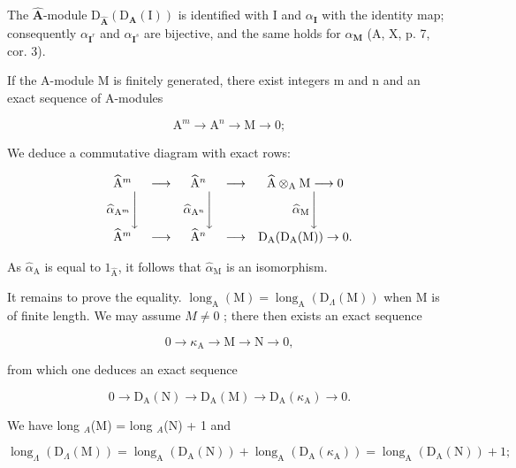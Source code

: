 The \(\widehat{\mathbf{A}}\)-module \(\mathrm{D}_{\widehat{\mathbf{A}}}(\mathrm{D}_{\mathbf{A}}(\mathrm{I}))\) is identified with I and \(\alpha_{\mathbf{I}}\) with the identity map; consequently \(\alpha_{\mathbf{I}^r}\) and \(\alpha_{\mathbf{I}^s}\) are bijective, and the same holds for \(\alpha_{\mathbf{M}}\) (A, X, p. 7, cor. 3).

If the A-module M is finitely generated, there exist integers m and n and an exact sequence of A-modules

\[
\mathrm{A} ^ {m} \longrightarrow \mathrm{A} ^ {n} \longrightarrow \mathrm{M} \rightarrow 0;
\]

We deduce a commutative diagram with exact rows:

\[
\begin{array}{c c c c c} \widehat {\mathrm{A}} ^ {m} & \longrightarrow & \widehat {\mathrm{A}} ^ {n} & \longrightarrow & \widehat {\mathrm{A}} \otimes_ {\mathrm{A}} \mathrm{M} \longrightarrow 0 \\ \widehat {\alpha} _ {\mathrm{A} ^ {m}} \Bigg \downarrow & & \widehat {\alpha} _ {\mathrm{A} ^ {n}} \Bigg \downarrow & & \widehat {\alpha} _ {\mathrm{M}} \Bigg \downarrow \\ \widehat {\mathrm{A}} ^ {m} & \longrightarrow & \widehat {\mathrm{A}} ^ {n} & \longrightarrow & \mathrm{D} _ {\mathrm{A}} (\mathrm{D} _ {\mathrm{A}} (\mathrm{M})) \to 0. \end{array}
\]

As \(\widehat{\alpha}_{\mathrm{A}}\) is equal to \(1_{\widehat{\mathrm{A}}}\), it follows that \(\widehat{\alpha}_{\mathrm{M}}\) is an isomorphism.

It remains to prove the equality. \(\operatorname{long}_{\mathrm{A}}(\mathrm{M}) = \operatorname{long}_{\mathrm{A}}(\mathrm{D}_{\Lambda}(\mathrm{M}))\) when M is of finite length. We may assume \(M \neq 0\) ; there then exists an exact sequence

\[
0 \rightarrow \kappa_ {\mathrm{A}} \longrightarrow \mathrm{M} \longrightarrow \mathrm{N} \rightarrow 0,
\]

from which one deduces an exact sequence

\[
0 \rightarrow \mathrm{D} _ {\mathrm{A}} (\mathrm{N}) \longrightarrow \mathrm{D} _ {\mathrm{A}} (\mathrm{M}) \longrightarrow \mathrm{D} _ {\mathrm{A}} (\kappa_ {\mathrm{A}}) \rightarrow 0.
\]

We have long \(_{A}\)(M) = long \(_{A}\)(N) + 1 and

\[
\operatorname{long} _ {\Lambda} \left(\mathrm{D} _ {\Lambda} (\mathrm{M})\right) = \operatorname{long} _ {\mathrm{A}} \left(\mathrm{D} _ {\mathrm{A}} (\mathrm{N})\right) + \operatorname{long} _ {\mathrm{A}} \left(\mathrm{D} _ {\mathrm{A}} \left(\kappa_ {\mathrm{A}}\right)\right) = \operatorname{long} _ {\mathrm{A}} \left(\mathrm{D} _ {\mathrm{A}} (\mathrm{N})\right) + 1;
\]

